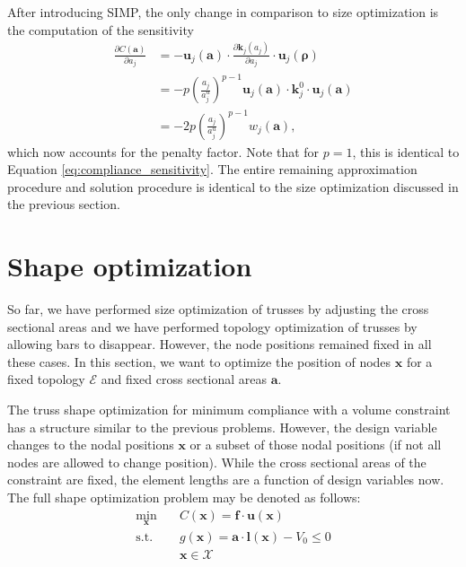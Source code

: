 After introducing SIMP, the only change in comparison to size optimization is the computation of the sensitivity
\begin{align}
    \frac{\partial C (\mathbf{a})}{\partial a_j} 
    &= - \mathbf{u}_j (\mathbf{a}) \cdot \frac{\partial \mathbf{k}_j(a_j)}{\partial a_j} \cdot \mathbf{u}_j (\pmb{\rho})  \\
    &= - p \left(\frac{a_j}{a_j^u}\right)^{p-1} \mathbf{u}_j (\mathbf{a}) \cdot \mathbf{k}^0_j \cdot \mathbf{u}_j (\mathbf{a})  \\
    &= - 2 p \left(\frac{a_j}{a_j^u}\right)^{p-1} w_j (\mathbf{a}),
\end{align}
which now accounts for the penalty factor. Note that for $p=1$, this is identical to Equation \eqref{eq:compliance_sensitivity}. 
The entire remaining approximation procedure and solution procedure is identical to the size optimization discussed in the previous section.

\section{Shape optimization}
So far, we have performed size optimization of trusses by adjusting the cross sectional areas and we have performed topology optimization of trusses by allowing bars to disappear. However, the node positions remained fixed in all these cases. 
In this section, we want to optimize the position of nodes $\mathbf{x}$ for a fixed topology $\mathcal{E}$ and fixed cross sectional areas $\mathbf{a}$.

The truss shape optimization for minimum compliance with a volume constraint has a structure similar to the previous problems. However, the design variable changes to the nodal positions $\mathbf{x}$ or a subset of those nodal positions (if not all nodes are allowed to change position). While the cross sectional areas of the constraint are fixed, the element lengths are a function of design variables now. The full shape optimization problem may be denoted as follows:
\begin{equation}
    \begin{aligned}
        \min_{\mathbf{x}} \quad & C(\mathbf{x}) = \mathbf{f} \cdot \mathbf{u}(\mathbf{x})\\
        \textrm{s.t.} \quad & g(\mathbf{x}) = \mathbf{a} \cdot \mathbf{l}(\mathbf{x}) - V_0 \le 0  \\
                            & \mathbf{x} \in \mathcal{X}\\
    \end{aligned}
    \label{eq:shape_optimization}
\end{equation}

